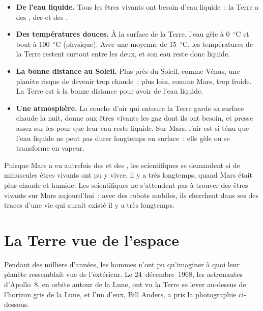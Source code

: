 \begin{itemize}
  \item \textbf{De l'eau liquide.} Tous les êtres vivants ont besoin d'eau
        liquide~: la Terre a des , des  et des .
  \item \textbf{Des températures douces.} À la surface de la Terre, l'eau
        gèle à 0~$^\circ$C et bout à 100~$^\circ$C (physique). Avec une
        moyenne de 15~$^\circ$C, les températures de la Terre restent
        surtout entre les deux, et son eau reste donc liquide.
  \item \textbf{La bonne distance au Soleil.} Plus près du Soleil, comme
        Vénus, une planète risque de devenir trop chaude~; plus loin, comme
        Mars, trop froide. La Terre est à la bonne distance pour avoir de
        l'eau liquide.
  \item \textbf{Une atmosphère.} La couche d'air qui entoure la Terre garde
        sa surface chaude la nuit, donne aux êtres vivants les gaz dont ils
        ont besoin, et presse assez sur les  pour que leur eau reste
        liquide. Sur Mars, l'air est si ténu que l'eau liquide ne peut pas
        durer longtemps en surface~: elle gèle ou se transforme en vapeur.
\end{itemize}

\begin{remark}\label{rem:g6:earth-a-planet:mars-life}
Puisque Mars a eu autrefois des  et des , les scientifiques se
demandent si de minuscules êtres vivants ont pu y vivre, il y a très
longtemps, quand Mars était plus chaude et humide. Les scientifiques ne
s'attendent pas à trouver des êtres vivants sur Mars aujourd'hui~; avec
des robots mobiles, ils cherchent dans ses  des traces d'une vie qui
aurait existé il y a très longtemps.
\end{remark}

\section{La Terre vue de l'espace}

Pendant des milliers d'années, les hommes n'ont pu qu'imaginer à quoi leur
planète ressemblait vue de l'extérieur. Le 24~décembre~1968, les
astronautes d'Apollo~8, en orbite autour de la Lune, ont vu la Terre se
lever au-dessus de l'horizon gris de la Lune, et l'un d'eux, Bill Anders,
a pris la photographie ci-dessous.

